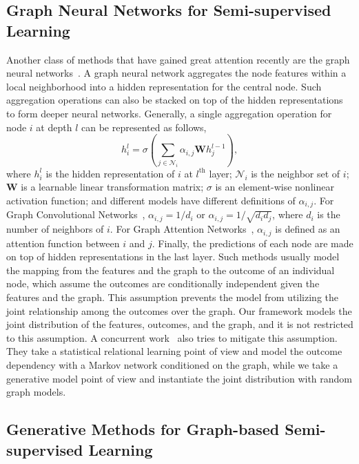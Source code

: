 \documentclass{article}
\def\mW{{\bm{W}}}
\def\gN{{\mathcal{N}}}
\begin{document}
\subsection{Graph Neural Networks for Semi-supervised Learning}
Another class of methods that have gained great attention recently are the graph neural networks~\cite{kipf2016semi,hamilton2017inductive,velivckovic2017graph}. A graph neural network aggregates the node features within a local neighborhood into a hidden representation for the central node. Such aggregation operations can also be stacked on top of the hidden representations to form deeper neural networks. Generally, a single aggregation operation for node $i$ at depth $l$ can be represented as follows,
$$h_i^{l} = \sigma(\sum_{j\in \gN_i}\alpha_{i,j}\mW h_j^{l-1}),$$
where $h_i^l$ is the hidden representation of $i$ at $l^{\text{th}}$ layer; $\gN_i$ is the neighbor set of $i$; $\mW$ is a learnable linear transformation matrix; $\sigma$ is an element-wise nonlinear activation function; and different models have different definitions of $\alpha_{i,j}$. For Graph Convolutional Networks~\cite{kipf2016semi}, $\alpha_{i,j} = 1/d_i$ or $\alpha_{i,j} = 1/\sqrt{d_i d_j}$, where $d_i$ is the number of neighbors of $i$. For Graph Attention Networks~\cite{velivckovic2017graph}, $\alpha_{i,j}$ is defined as an attention function between $i$ and $j$. Finally, the predictions of each node are made on top of hidden representations in the last layer. Such methods usually model the mapping from the features and the graph to the outcome of an individual node, which assume the outcomes are conditionally independent given the features and the graph. This assumption prevents the model from utilizing the joint relationship among the outcomes over the graph. Our framework models the joint distribution of the features, outcomes, and the graph, and it is not restricted to this assumption. A concurrent work~\cite{qu2019gmnn} also tries to mitigate this assumption. They take a statistical relational learning point of view and model the outcome dependency with a Markov network conditioned on the graph, while we take a generative model point of view and instantiate the joint distribution with random graph models.

\subsection{Generative Methods for Graph-based Semi-supervised Learning}
\end{document}
